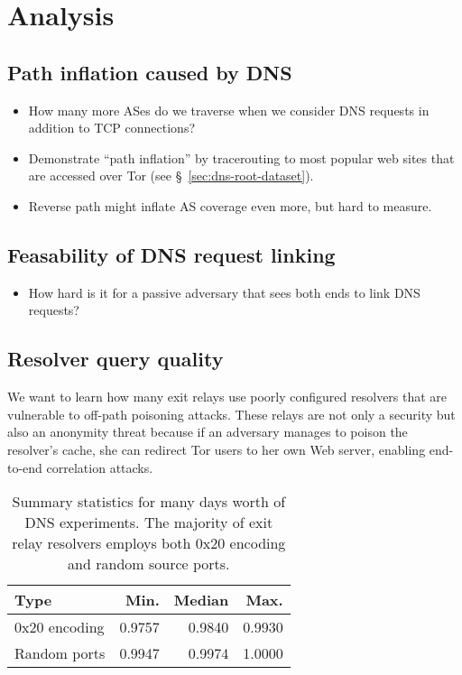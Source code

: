 \section{Analysis}
\label{sec:analysis}

\subsection{Path inflation caused by DNS}
\begin{itemize}
	\item How many more ASes do we traverse when we consider DNS requests in
		addition to TCP connections?
	\item Demonstrate ``path inflation'' by tracerouting to most popular web
		sites that are accessed over Tor (see \S~\ref{sec:dns-root-dataset}).
	\item Reverse path might inflate AS coverage even more, but hard to measure.
\end{itemize}

\subsection{Feasability of DNS request linking}
\begin{itemize}
	\item How hard is it for a passive adversary that sees both ends to link DNS
		requests?
\end{itemize}

\subsection{Resolver query quality}
We want to learn how many exit relays use poorly configured resolvers that are
vulnerable to off-path poisoning attacks.  These relays are not only a security
but also an anonymity threat because if an adversary manages to poison the
resolver's cache, she can redirect Tor users to her own Web server, enabling
end-to-end correlation attacks.

\begin{table}[t]
	\centering
	\begin{tabular}{l r r r}
	\toprule
	\textbf{Type} & \textbf{Min.} & \textbf{Median} & \textbf{Max.} \\
	\midrule
	0x20 encoding & 0.9757 & 0.9840 & 0.9930 \\
	Random ports & 0.9947 & 0.9974 & 1.0000 \\
	\bottomrule
	\end{tabular}
	\caption{Summary statistics for many days worth of DNS experiments.  The
	majority of exit relay resolvers employs both 0x20 encoding and random
	source ports.}
	\label{tab:traversed-ass}
\end{table}
